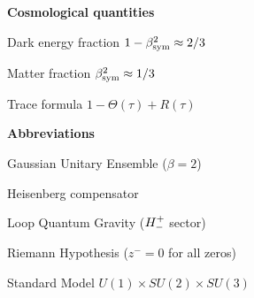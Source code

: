 \begin{minipage}[t]{0.48\textwidth}
\medskip
\noindent\textbf{Cosmological quantities}
\begin{description}[leftmargin=1.8em, labelindent=0pt, itemsep=1pt]
  \item[$\Omega_\Lambda$] Dark energy fraction $1-\beta_{\mathrm{sym}}^2\approx 2/3$
  \item[$\Omega_M$] Matter fraction $\beta_{\mathrm{sym}}^2\approx 1/3$
  \item[$\Sigma(\tau)$] Trace formula $1-\Theta(\tau)+R(\tau)$
\end{description}

\medskip
\noindent\textbf{Abbreviations}
\begin{description}[leftmargin=1.8em, labelindent=0pt, itemsep=1pt]
  \item[GUE] Gaussian Unitary Ensemble ($\beta=2$)
  \item[HC] Heisenberg compensator
  \item[LQG] Loop Quantum Gravity ($H^+_-$ sector)
  \item[RH] Riemann Hypothesis ($z^-=0$ for all zeros)
  \item[SM] Standard Model $U(1)\times SU(2)\times SU(3)$
\end{description}
\end{minipage}


\clearpage

